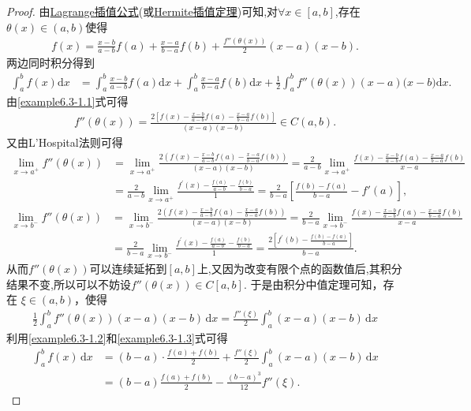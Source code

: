 \documentclass[../../main.tex]{subfiles}
\begin{document}
\begin{proof}
由\hyperref[proposition:Lagrange插值公式]{Lagrange插值公式}(或\hyperref[theorem:Hermite插值定理]{Hermite插值定理})可知,对$\forall x\in [a,b]$,存在$\theta (x)\in (a,b)$使得
\begin{align}\label{example6.3-1.1}
f(x) = \frac{x - b}{a - b} f(a) + \frac{x - a}{b - a} f(b) + \frac{f''(\theta (x))}{2} (x - a)(x - b).
\end{align}
两边同时积分得到
\begin{align}
\int_a^b{f(x)\mathrm{d}x}&=\int_a^b{\frac{x-b}{a-b}f(a)\mathrm{d}x}+\int_a^b{\frac{x-a}{b-a}f(b)\mathrm{d}x}+\frac{1}{2}\int_a^b{f'' (\theta (x) )(x-a)(x-b})\mathrm{d}x.\label{example6.3-1.2}
\end{align}
由\eqref{example6.3-1.1}式可得
\begin{align*}
f'' (\theta (x) )=\frac{2\left[ f\left( x \right) -\frac{x-b}{a-b}f(a)-\frac{x-a}{b-a}f\left( b \right) \right]}{(x-a)(x-b)}\in C\left( a,b \right) .
\end{align*}
又由L'Hospital法则可得
\begin{align*}
\underset{x\rightarrow a^+}{\lim}f'' \left( \theta \left( x \right) \right) &=\underset{x\rightarrow a^+}{\lim}\frac{2\left( f\left( x \right) -\frac{x-b}{a-b}f(a)-\frac{x-a}{b-a}f\left( b \right) \right)}{(x-a)(x-b)}=\frac{2}{a-b}\underset{x\rightarrow a^+}{\lim}\frac{f\left( x \right) -\frac{x-b}{a-b}f(a)-\frac{x-a}{b-a}f\left( b \right)}{x-a}
\\
&=\frac{2}{a-b}\lim_{x\rightarrow a^+} \frac{f^{\prime}(x)-\frac{f(a)}{a-b}-\frac{f(b)}{b-a}}{1}=\frac{2}{b-a}\left[ \frac{f\left( b \right) -f\left( a \right)}{b-a}-f' \left( a \right) \right] ,   
\end{align*}
\begin{align*}
\underset{x\rightarrow b^-}{\lim}f'' \left( \theta \left( x \right) \right) &=\underset{x\rightarrow b^-}{\lim}\frac{2\left( f(x)-\frac{x-b}{a-b}f(a)-\frac{x-a}{b-a}f(b) \right)}{(x-a)(x-b)}=\frac{2}{b-a}\underset{x\rightarrow b^-}{\lim}\frac{f\left( x \right) -\frac{x-b}{a-b}f(a)-\frac{x-a}{b-a}f\left( b \right)}{x-a}
\\
&=\frac{2}{b-a}\lim_{x\rightarrow b^-} \frac{f^{\prime}(x)-\frac{f(a)}{a-b}-\frac{f(b)}{b-a}}{1}=\frac{2\left[ f^{\prime}(b)-\frac{f(b)-f(a)}{b-a} \right]}{b-a}.   
\end{align*}
从而$f'' \left( \theta \left( x \right) \right)$可以连续延拓到$[a,b]$上,又因为改变有限个点的函数值后,其积分结果不变,所以可以不妨设$f''(\theta(x))\in C[a,b]$.
于是由积分中值定理可知，存在 $\xi \in (a, b)$，使得
\begin{align}
\frac{1}{2} \int_a^b f''(\theta (x)) (x-a)(x-b) \, \mathrm{d}x = \frac{f''(\xi)}{2} \int_a^b (x-a)(x-b) \, \mathrm{d}x \label{example6.3-1.3}
\end{align}
利用\eqref{example6.3-1.2}和\eqref{example6.3-1.3}式可得
\begin{align*}
\int_a^b f(x) \, \mathrm{d}x &= (b-a) \cdot \frac{f(a) + f(b)}{2} + \frac{f''(\xi)}{2} \int_a^b (x-a)(x-b) \, \mathrm{d}x \\
&= (b-a) \frac{f(a) + f(b)}{2} - \frac{(b-a)^3}{12} f''(\xi). 
\end{align*}


\end{proof}
\end{document}
